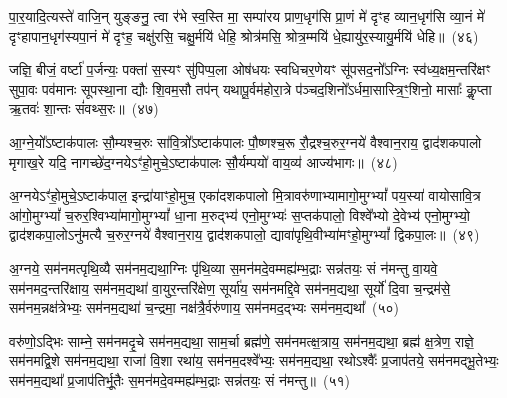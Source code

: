 {%
पा॒र॒यादि॒त्यस्ते॑ वाजि॒न् युङ्ङनु॒ त्वा र॑भे स्व॒स्ति मा॒ सम्पा॑रय प्राण॒धृग॑सि प्रा॒णं मे॑ दृꣳह व्यान॒धृग॑सि व्या॒नं मे॑ दृꣳहापान॒धृग॑स्यपा॒नं मे॑ दृꣳह॒ चक्षु॑रसि॒ चक्षु॒र्मयि॑ धेहि॒ श्रोत्र॑मसि॒ श्रोत्र॒म्मयि॑ धे॒ह्यायु॑र॒स्यायु॒र्मयि॑ धेहि॥~(४६)

{\anuvakamend[{वा॒युस्ते॑ वाजि॒न् युङ्ङनु॒ त्वा र॑भे स्व॒स्ति मा॒ सन्त्रिच॑त्वारिꣳशच्च}]}%

जज्ञि॒ बीजं॒ वर्\mbox{}ष्टा॑ प॒र्जन्यः॒ पक्ता॑ स॒स्यꣳ सु॑पिप्प॒ला ओष॑धयः स्वधिचर॒णेयꣳ सू॑पसद॒नो᳚\-ऽग्निः स्व॑ध्य॒क्षम॒न्तरि॑क्षꣳ सुपा॒वः पव॑मानः सूपस्था॒ना द्यौः शि॒वम॒सौ तप॑न् यथापू॒र्वम॑होरा॒त्रे प॑ञ्चद॒शिनो᳚\-ऽर्धमा॒सास्त्रि॒ꣳ॒शिनो॒ मासाः᳚ कॢ॒प्ता ऋ॒तवः॑ शा॒न्तः सं॑वथ्स॒रः॥~(४७)

{\anuvakamend[{जज्ञि॒ बीज॒मेक॑त्रिꣳशत्}]}%

आ॒ग्ने॒यो᳚\-ऽष्टाक॑पालः सौ॒म्यश्च॒रुः सा॑वि॒त्रो᳚\-ऽष्टाक॑पालः पौ॒ष्णश्च॒रू रौ॒द्रश्च॒रुर॒ग्नये॑ वैश्वान॒राय॒ द्वाद॑श\-कपालो मृगाख॒रे यदि॒ नागच्छे॑द॒ग्नये\-ऽꣳ॑हो॒मुचे॒\-ऽष्टाक॑पालः सौ॒र्यम्पयो॑ वाय॒व्य॑ आज्य॑भागः॥~(४८)

{\anuvakamend[{आ॒ग्ने॒यश्चतु॑र्विꣳशतिः}]}%

अ॒ग्नये\-ऽꣳ॑हो॒मुचे॒\-ऽष्टाक॑पाल॒ इन्द्रा॑याꣳहो॒मुच॒ एका॑\-दश\-कपालो मि॒त्रावरु॑णाभ्यामागो॒मुग्\-भ्यां᳚ पय॒स्या॑ वायोसावि॒त्र आ॑गो॒मुग्\-भ्यां᳚ च॒रुर॒श्विभ्या॑मागो॒मुग्\-भ्यां᳚ धा॒ना म॒रुद्भ्य॑ एनो॒मुग्भ्यः॑ स॒प्तक॑पालो॒ विश्वे᳚भ्यो दे॒वेभ्य॑ एनो॒मुग्भ्यो॒ द्वाद॑श\-कपा॒लो\-ऽनु॑मत्यै च॒रुर॒ग्नये॑ वैश्वान॒राय॒ द्वाद॑श\-कपालो॒ द्यावा॑पृथि॒वीभ्या॑मꣳहो॒मुग्\-भ्यां᳚ द्विकपा॒लः॥~(४९)

{\anuvakamend[{अ॒ग्नये\-ऽꣳ॑हो॒मुचे᳚ त्रि॒ꣳ॒शत्}]}%

अ॒ग्नये॒ सम॑नमत्पृथि॒व्यै सम॑नम॒द्यथा॒ग्निः पृ॑थि॒व्या स॒मन॑मदे॒वम्मह्य॑म्भ॒द्राः सन्न॑तयः॒ सं न॑मन्तु वा॒यवे॒ सम॑नमद॒न्तरि॑क्षाय॒ सम॑नम॒द्यथा॑ वा॒युर॒न्तरि॑क्षेण॒ सूर्या॑य॒ सम॑नमद्दि॒वे सम॑नम॒द्यथा॒ सूर्यो॑ दि॒वा च॒न्द्रम॑से॒ सम॑नम॒न्नक्ष॑त्रेभ्यः॒ सम॑नम॒द्यथा॑ च॒न्द्रमा॒ नक्ष॑त्रै॒र्वरु॑णाय॒ सम॑नमद॒द्भ्यः सम॑नम॒द्यथा᳚~(५०)

वरु॑णो॒\-ऽद्भिः साम्ने॒ सम॑नमदृ॒चे सम॑नम॒द्यथा॒ साम॒र्चा ब्रह्म॑णे॒ सम॑नमत्क्ष॒त्राय॒ सम॑नम॒द्यथा॒ ब्रह्म॑ क्ष॒त्रेण॒ राज्ञे॒ सम॑नमद्वि॒शे सम॑नम॒द्यथा॒ राजा॑ वि॒शा रथा॑य॒ सम॑नम॒दश्वे᳚भ्यः॒ सम॑नम॒द्यथा॒ रथो\-ऽश्वैः᳚ प्र॒जाप॑तये॒ सम॑नमद्भू॒तेभ्यः॒ सम॑नम॒द्यथा᳚ प्र॒जा\-प॑तिर्भू॒तैः स॒मन॑मदे॒वम्मह्य॑म्भ॒द्राः सन्न॑तयः॒ सं न॑मन्तु॥~(५१)

{\anuvakamend[{अ॒द्भ्यः सम॑नम॒द्यथा॒ मह्यं॑ च॒त्वारि॑ च}]}%

}
